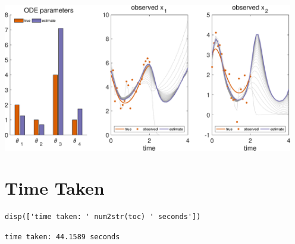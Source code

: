 {
\centering
\includegraphics [width=5in]{VGM_for_Lotka_Volterra_42.eps}

}

\section{Time Taken}

\color{RoyalPurple}\begin{verbatim}
disp(['time taken: ' num2str(toc) ' seconds'])
\end{verbatim}
\color{black}
\color{black}

        \color{MidnightBlue}\begin{verbatim}time taken: 44.1589 seconds
\end{verbatim}
\color{black} 